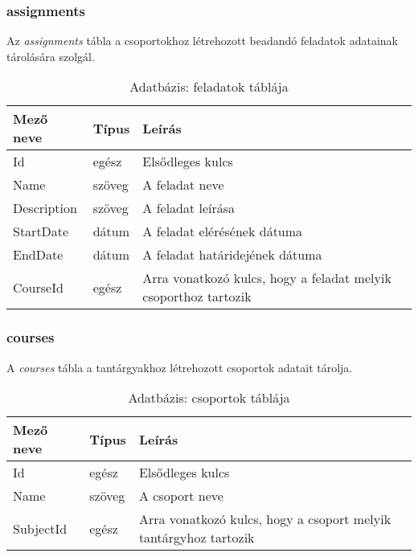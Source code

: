 \subsubsection{assignments}
Az \emph{assignments} tábla a csoportokhoz létrehozott beadandó feladatok adatainak tárolására szolgál.
\begin{table}[H]
	\centering
	\begin{tabular}{ | m{} | m{} | m{} | }
		\hline
		\textbf{Mező neve} & \textbf{Típus} & \textbf{Leírás} \\
		\hline \hline
		Id & egész & Elsődleges kulcs \\
		\hline
		Name & szöveg & A feladat neve \\
		\hline
		Description & szöveg & A feladat leírása \\
		\hline
		StartDate & dátum & A feladat elérésének dátuma \\
		\hline
		EndDate & dátum & A feladat határidejének dátuma \\
		\hline
		CourseId & egész & Arra vonatkozó kulcs, hogy a feladat melyik csoporthoz tartozik \\
		\hline
	\end{tabular}
	\caption{Adatbázis: feladatok táblája}
	\label{tab:db-assignments}
\end{table}
\subsubsection{courses}
A \emph{courses} tábla a tantárgyakhoz létrehozott csoportok adatait tárolja.
\begin{table}[H]
	\centering
	\begin{tabular}{ | m{} | m{} | m{} | }
		\hline
		\textbf{Mező neve} & \textbf{Típus} & \textbf{Leírás} \\
		\hline \hline
		Id & egész & Elsődleges kulcs \\
		\hline
		Name & szöveg & A csoport neve \\
		\hline
		SubjectId & egész & Arra vonatkozó kulcs, hogy a csoport melyik tantárgyhoz tartozik \\
		\hline
	\end{tabular}
	\caption{Adatbázis: csoportok táblája}
	\label{tab:db-courses}
\end{table}
